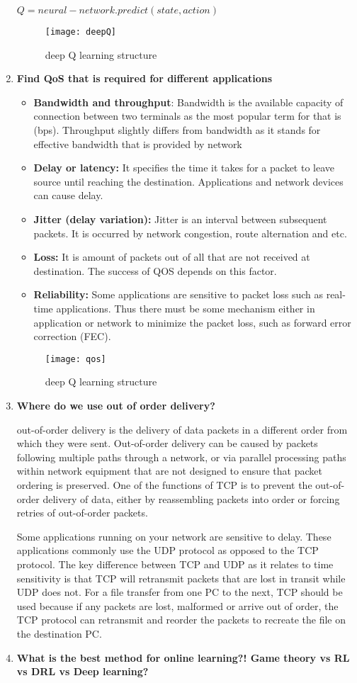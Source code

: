 \documentclass[conference]{IEEEtran}
\begin{document}
\begin{enumerate}
$Q = neural-network.predict(state, action)$
\begin{figure}%
  \centering
    \texttt{[image: deepQ]}
  \caption{deep Q learning structure \cite{drl}}
  \label{fig:drl}
\end{figure}
\item  \textbf{Find QoS that is required for different applications }
\begin{itemize}
\item \textbf{Bandwidth and throughput}: Bandwidth is the available capacity of connection between two terminals as the most popular term for that is (bps). Throughput slightly differs
from bandwidth as it stands for effective bandwidth that is
provided by network
\item \textbf{Delay or latency:} It specifies the time it takes for a packet
to leave source until reaching the destination. Applications
and network devices can cause delay.
\item \textbf{Jitter (delay variation):} Jitter is an interval between
subsequent packets. It is occurred by network congestion,
route alternation and etc. 
\item \textbf{Loss:} It is amount of packets out of all that are not received
at destination. The success of QOS depends on this factor.
\item \textbf{Reliability:} Some applications are sensitive to packet loss
such as real-time applications. Thus there must be some
mechanism either in application or network to minimize the
packet loss, such as forward error correction (FEC).
\end{itemize}
\begin{figure}%
  \centering
    \texttt{[image: qos]}
  \caption{deep Q learning structure \cite{qos}}
  \label{fig:qos}
\end{figure}
\item \textbf{Where do we use out of order delivery?}

out-of-order delivery is the delivery of data packets in a different order from which they were sent. Out-of-order delivery can be caused by packets following multiple paths through a network, or via parallel processing paths within network equipment that are not designed to ensure that packet ordering is preserved. One of the functions of TCP is to prevent the out-of-order delivery of data, either by reassembling packets into order or forcing retries of out-of-order packets.

Some applications running on your network are sensitive to delay. These applications commonly use the UDP protocol as opposed to the TCP protocol. The key difference between TCP and UDP as it relates to time sensitivity is that TCP will retransmit packets that are lost in transit while UDP does not. For a file transfer from one PC to the next, TCP should be used because if any packets are lost, malformed or arrive out of order, the TCP protocol can retransmit and reorder the packets to recreate the file on the destination PC.
\item \textbf{ What is the best method for online learning?! Game theory vs RL vs DRL vs Deep learning?}


\end{enumerate}
\end{document}
